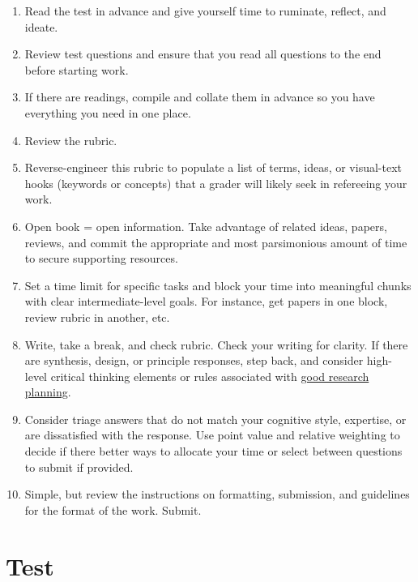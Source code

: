 \documentclass[
]{book}
\providecommand{\tightlist}{%
  \setlength{\itemsep}{0pt}\setlength{\parskip}{0pt}}
\begin{document}
\begin{enumerate}
\def\labelenumi{\arabic{enumi}.}
\tightlist
\item
  Read the test in advance and give yourself time to ruminate, reflect, and ideate.\\
\item
  Review test questions and ensure that you read all questions to the end before starting work.\\
\item
  If there are readings, compile and collate them in advance so you have everything you need in one place.\\
\item
  Review the rubric.\\
\item
  Reverse-engineer this rubric to populate a list of terms, ideas, or visual-text hooks (keywords or concepts) that a grader will likely seek in refereeing your work.
\item
  Open book = open information. Take advantage of related ideas, papers, reviews, and commit the appropriate and most parsimonious amount of time to secure supporting resources.\\
\item
  Set a time limit for specific tasks and block your time into meaningful chunks with clear intermediate-level goals. For instance, get papers in one block, review rubric in another, etc.\\
\item
  Write, take a break, and check rubric. Check your writing for clarity. If there are synthesis, design, or principle responses, step back, and consider high-level critical thinking elements or rules associated with \href{https://journals.plos.org/ploscompbiol/article?id=10.1371/journal.pcbi.1010139}{good research planning}.\\
\item
  Consider triage answers that do not match your cognitive style, expertise, or are dissatisfied with the response. Use point value and relative weighting to decide if there better ways to allocate your time or select between questions to submit if provided.\\
\item
  Simple, but review the instructions on formatting, submission, and guidelines for the format of the work. Submit.
\end{enumerate}

\hypertarget{test}{%
\chapter{Test}\label{test}}
\end{document}
